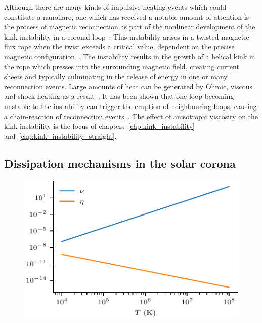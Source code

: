 Although there are many kinds of impulsive heating events which could constitute a nanoflare, one which has received a notable amount of attention is the process of magnetic reconnection as part of the nonlinear development of the kink instability in a coronal loop~\cite{hoodKinkInstabilitySolar1979,browningSolarCoronalHeating2003c,hoodCoronalHeatingMagnetic2009,browningHeatingCoronaNanoflares2008a}. This instability arises in a twisted magnetic flux rope when the twist exceeds a critical value, dependent on the precise magnetic configuration~\cite{hoodCoronalHeatingMagnetic2009}. The instability results in the growth of a helical kink in the rope which presses into the surrounding magnetic field, creating current sheets and typically culminating in the release of energy in one or many reconnection events. Large amounts of heat can be generated by Ohmic, viscous and shock heating as a result~\cite{barefordShockHeatingNumerical2015,hoodCoronalHeatingMagnetic2009}. It has been shown that one loop becoming unstable to the instability can trigger the eruption of neighbouring loops, causing a chain-reaction of reconnection events~\cite{hoodMHDAvalancheModel2015}. The effect of anisotropic viscosity on the kink instability is the focus of chapters~\ref{chp:kink_instability} and~\ref{chp:kink_instability_straight}.

\subsection{Dissipation mechanisms in the solar corona}

\begin{figure}[t]
  \centering
  \includegraphics[width=0.5\linewidth]{visc_dep_on_temp.pdf}
  \label{fig:visc_dep_on_temp}
\end{figure}

